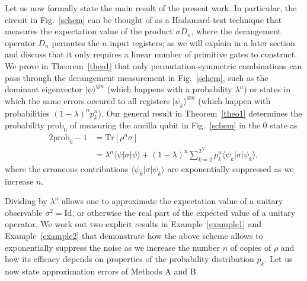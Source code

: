 \documentclass[aps,prx,showpacs,twocolumn,reprint]{revtex4-2}
\newcommand{\tr}{\mathrm{Tr}}
\newcommand{\prob}{\mathrm{prob}_0}
\begin{document}
Let us now formally state the main result of the present work.
In particular, the  circuit in
Fig.~\ref{schem} can be thought of as a Hadamard-test technique \cite{nielsenChuang}
that measures the expectation value of the product $\sigma D_n$, where the derangement operator
$D_n$ permutes the $n$ input registers; as we will explain in a later section
and discuss that it only requires a linear number of primitive gates to construct.
We prove in Theorem~\ref{theo1}
that only permutation-symmetric combinations can pass through the derangement measurement
in Fig.~\ref{schem},
such as the dominant eigenvector $| \psi \rangle^{\otimes n}$
(which happens with a probability $\lambda^n$) or states in which
the same errors occured to all registers $| \psi_k \rangle^{\otimes n}$
(which happen with probabilities $(1-\lambda)^n p_k^n$).
Our general result in Theorem~\ref{theo1} determines the probability $\prob$ of measuring the
ancilla qubit in Fig.~\ref{schem} in the $0$ state as
\begin{align*}\label{prob0}
2 \mathrm{prob}_0 -1 &= \tr[\rho^n \sigma] 
\\ &= \lambda^n \langle\psi |\sigma | \psi \rangle
+  (1-\lambda)^n\sum_{k=2}^{2^N} p_k^n  \langle\psi_k |\sigma | \psi_k \rangle,
\end{align*}
where the erroneous contributions $\langle\psi_k |\sigma | \psi_k \rangle$ are
exponentially suppressed as we increase $n$.


Dividing by $\lambda^n$ allows one to approximate the expectation value of a unitary observable
$\sigma^2 = \mathrm{Id}$, or otherwise the real part of the expected value
of a unitary operator. 
We work out two explicit results in Example~\ref{example1} and Example~\ref{example2}
that demonstrate how the above scheme allows to exponentially suppress the noise
as we increase the number $n$ of copies of $\rho$ and how its efficacy depends
on properties of the probability distribution $p_k$.
Let us now state approximation errors of Methods A and B.
\end{document}
